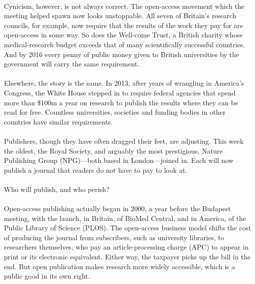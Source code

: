 \documentclass[a4paper, 12pt, UTF8]{article}
\begin{document}
\paragraph*{}
    Cynicism, however, is not always correct. The open-access movement which the meeting helped spawn now looks unstoppable. All seven of Britain’s research councils, for example, now require that the results of the work they pay for are open-access in some way. So does the Well-come Trust, a British charity whose medical-research budget exceeds that of many scientifically successful countries. And by 2016 every penny of public money given to British universities by the government will carry the same requirement.

\paragraph*{}
    Elsewhere, the story is the same. In 2013, after years of wrangling in America’s Congress, the White House stepped in to require federal agencies that spend more than \$100m a year on research to publish the results where they can be read for free. Countless universities, societies and funding bodies in other countries have similar requirements.

\paragraph*{}
    Publishers, though they have often dragged their feet, are adjusting. This week the oldest, the Royal Society, and arguably the most prestigious, Nature Publishing Group (NPG)—both based in London—joined in. Each will now publish a journal that readers do not have to pay to look at.

\paragraph*{}
    \begin{bfseries}
        \large
        Who will publish, and who perish?
    \end{bfseries}

\paragraph*{}
    Open-access publishing actually began in 2000, a year before the Budapest meeting, with the launch, in Britain, of BioMed Central, and in America, of the Public Library of Science (PLOS). The open-access business model shifts the cost of producing the journal from subscribers, such as university libraries, to researchers themselves, who pay an article-processing charge (APC) to appear in print or its electronic equivalent. Either way, the taxpayer picks up the bill in the end. But open publication makes research more widely accessible, which is a public good in its own right.
\end{document}
